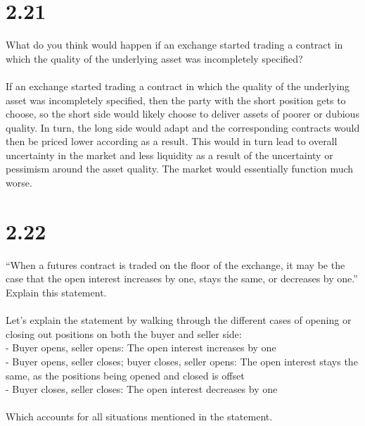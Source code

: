 \documentclass{article}
\begin{document}
{\Large 

\section*{2.21}

What do you think would happen if an exchange started trading a contract in which the quality of the underlying asset was incompletely specified? \\ \\
If an exchange started trading a contract in which the quality of the underlying asset was incompletely specified, then the party with the short position gets to choose, so the short side would likely choose to deliver assets of poorer or dubious quality. In turn, the long side would adapt and the corresponding contracts would then be priced lower according as a result. This would in turn lead to overall uncertainty in the market and less liquidity as a result of the uncertainty or pessimism around the asset quality. The market would essentially function much worse.

}
{\Large 

\section*{2.22}

“When a futures contract is traded on the floor of the exchange, it may be the case that the open interest increases by one, stays the same, or decreases by one.” Explain this statement. \\ \\ 
Let's explain the statement by walking through the different cases of opening or closing out positions on both the buyer and seller side: \\
- Buyer opens, seller opens: The open interest increases by one \\
- Buyer opens, seller closes; buyer closes, seller opens: The open interest stays the same, as the positions being opened and closed is offset \\
- Buyer closes, seller closes: The open interest decreases by one \\ \\
Which accounts for all situations mentioned in the statement. 

}
\end{document}
